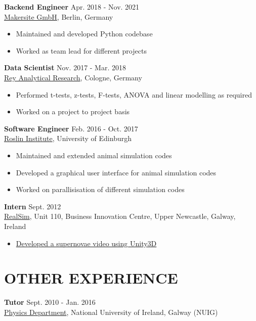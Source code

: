 \documentclass[margin, 10pt]{res} %
\begin{document}
\begin{resume}
{\bf Backend Engineer} \hfill Apr. 2018 - Nov. 2021 \\
\href{https://www.makersite.de/}{Makersite GmbH}, Berlin, Germany
\begin{itemize} \itemsep -2pt
 \item Maintained and developed Python codebase
 \item Worked as team lead for different projects
\end{itemize}


{\bf Data Scientist } \hfill Nov. 2017 - Mar. 2018 \\
\href{http://www.reyar.de}{Rey Analytical Research}, Cologne, Germany
\begin{itemize} \itemsep -2pt
\item Performed t-tests, z-tests, F-tests, ANOVA and linear modelling as required
\item Worked on a project to project basis
\end{itemize}


{\bf Software Engineer} \hfill Feb. 2016 - Oct. 2017 \\
\href{http://www.alphagenes.roslin.ed.ac.uk/diarmaid-debruca/}{Roslin Institute}, University of Edinburgh
\begin{itemize} \itemsep -2pt
 \item Maintained and extended animal simulation codes
 \item Developed a graphical user interface for animal simulation codes
 \item Worked on parallisisation of different simulation codes
\end{itemize}

{\bf Intern }\hfill Sept. 2012\\
\href{http://www.realsim.ie/home}{RealSim}, Unit 110, Business Innovation Centre, Upper Newcastle, Galway, Ireland  
\begin{itemize} \itemsep -2pt
 \item \href{https://www.youtube.com/watch?v=MRwUUMN-JCU}{Developed a supernovae video using Unity3D} 
\end{itemize}

\section{OTHER EXPERIENCE}
{\bf Tutor} \hfill Sept. 2010 - Jan. 2016 \\
\href{http://www.nuigalway.ie/physics/}{Physics Department}, National University of Ireland, Galway (NUIG)


\end{resume}
\end{document}
